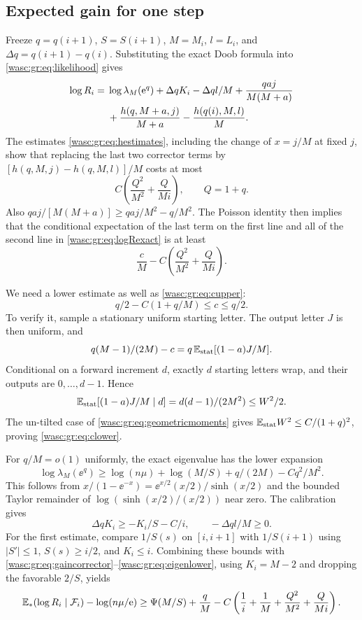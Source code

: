 \documentclass[11pt,a4paper]{article}
\theoremstyle{remark}\newtheorem{remark}[theorem]{Remark}
\numberwithin{equation}{section}
\begin{document}
\subsection{Expected gain for one step}
Freeze $q=q(i+1)$, $S=S(i+1)$, $M=M_i$, $l=L_i$, and $\Delta q=q(i+1)-q(i)$. Substituting the exact Doob formula into \eqref{wasc:gr:eq:likelihood} gives
\begin{align}\label{wasc:gr:eq:logRexact}
\log R_i={}&\log\lambda_M(\mathrm e^q)+\Delta qK_i-\Delta ql/M
+\frac{qaj}{M(M+a)}\notag\\
&+\frac{h(q,M+a,j)}{M+a}-\frac{h(q(i),M,l)}M.
\end{align}
The estimates \eqref{wasc:gr:eq:hestimates}, including the change of $x=j/M$ at fixed $j$, show that replacing the last two corrector terms by $[h(q,M,j)-h(q,M,l)]/M$ costs at most
\[
C\left(\frac{Q^2}{M^2}+\frac{Q}{Mi}\right),\qquad Q=1+q.
\]
Also $qaj/[M(M+a)]\ge qaj/M^2-q/M^2$. The Poisson identity then implies that the conditional expectation of the last term on the first line and all of the second line in \eqref{wasc:gr:eq:logRexact} is at least
\begin{equation}\label{wasc:gr:eq:gaincorrector}
\frac cM-C\left(\frac{Q^2}{M^2}+\frac{Q}{Mi}\right).
\end{equation}

We need a lower estimate as well as \eqref{wasc:gr:eq:cupper}:
\begin{equation}\label{wasc:gr:eq:clower}
q/2-C(1+q/M)\le c\le q/2.
\end{equation}
To verify it, sample a stationary uniform starting letter. The output letter $J$ is then uniform, and
\[
q(M-1)/(2M)-c=q\,\mathbb E_{\mathrm{stat}}[(1-a)J/M].
\]
Conditional on a forward increment $d$, exactly $d$ starting letters wrap, and their outputs are $0,\ldots,d-1$. Hence
\[
\mathbb E_{\mathrm{stat}}[(1-a)J/M\mid d]=d(d-1)/(2M^2)\le W^2/2.
\]
The un-tilted case of \eqref{wasc:gr:eq:geometricmoments} gives $\mathbb E_{\mathrm{stat}}W^2\le C/(1+q)^2$, proving \eqref{wasc:gr:eq:clower}.

For $q/M=o(1)$ uniformly, the exact eigenvalue has the lower expansion
\begin{equation}\label{wasc:gr:eq:eigenlower}
\log\lambda_M(\ee^q)\ge\log(n\mu)+\log(M/S)
+q/(2M)-Cq^2/M^2.
\end{equation}
This follows from $x/(1-\ee^{-x})=\ee^{x/2}(x/2)/\sinh(x/2)$ and the bounded Taylor remainder of $\log(\sinh(x/2)/(x/2))$ near zero. The calibration gives
\[
\Delta q K_i\ge-K_i/S-C/i,\qquad -\Delta ql/M\ge0.
\]
For the first estimate, compare $1/S(s)$ on $[i,i+1]$ with $1/S(i+1)$ using $|S'|\le1$, $S(s)\ge i/2$, and $K_i\le i$. Combining these bounds with \eqref{wasc:gr:eq:gaincorrector}--\eqref{wasc:gr:eq:eigenlower}, using $K_i=M-2$ and dropping the favorable $2/S$, yields
\begin{align}\label{wasc:gr:eq:expectedstep}
\mathbb E_*(\log R_i\mid\mathcal F_i)-\log(n\mu/\mathrm e)
\ge\Psi(M/S)+\frac qM
-C\left(\frac1i+\frac1M+\frac{Q^2}{M^2}+\frac{Q}{Mi}\right).
\end{align}
\end{document}
